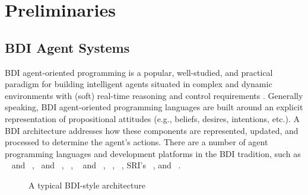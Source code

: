 \section{Preliminaries}\label{sec:preliminaries}

\newcommand{\success}{\mbox{\emph{succ}}}
\newcommand{\failure}{\mbox{\emph{fail}}}

\newcommand{\procedurefont}[1]{\mathsf{#1}}
\newcommand{\StableGoal}{\procedurefont{StableGoal}}
\newcommand{\RecordTrace}{\procedurefont{RecordFailedTrace}}
\newcommand{\RecordWorldDT}{\procedurefont{RecordWorldDT}}



\subsection{BDI Agent Systems}\label{sec:bdi_programming}

BDI agent-oriented programming is a popular, well-studied, and practical paradigm
for building intelligent agents situated in complex and dynamic environments with
(soft) real-time reasoning and control requirements
\cite{Georgeff89-PRS,Benfield:AAMAS06}.
Generally speaking, BDI agent-oriented programming languages are built around an
explicit representation of propositional attitudes (e.g., beliefs, desires,
intentions, etc.). A BDI architecture addresses how these components are
represented, updated, and processed to determine the agent's actions.
There are a number of agent programming languages and development platforms in
the BDI tradition, such as \PRS~\cite{IngrandGR:IEEE92-PRS} and
\dMARS~\cite{Inverno:JAAMAS04-dMARS}, \AgentSpeak\ and
\JASON~\cite{Rao:LNCS96-AgentSpeak,Bordini:07-JASONBOOK},
\JADEX~\cite{PokahrBL:EXP03-JADEX},
\TAPL~\cite{Hindriks:JAAMAS99-3APL,DastaniRM:05} and
\DAPL~\cite{Dastani:JAAMAS08-2APL}, \GOAL~\cite{BoerHHM:JAPL07-GOAL},
\JACK~\cite{BusettaRHL:AL99-JACK}, SRI's \SPARK~\cite{MorelyM:AAMAS04-SPARK}, and
\JAM~\cite{Huber:AGENTS99-JAM}.



\begin{figure}[t]
\begin{center}
\resizebox{.9\textwidth}{!}{}
\end{center}
\caption{A typical BDI-style architecture}
\label{fig:bdiarch}
\end{figure}

